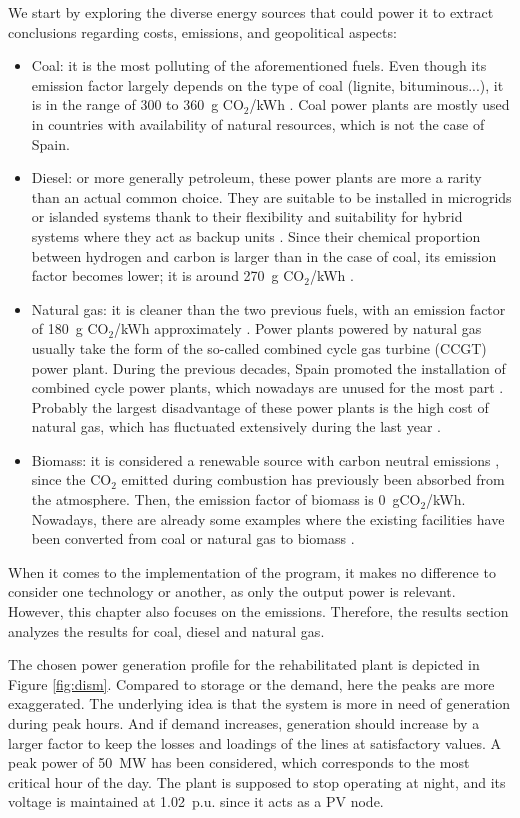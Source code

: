 We start by exploring the diverse energy sources that could power it to extract conclusions regarding costs, emissions, and geopolitical aspects:
\begin{itemize}
  \item Coal: it is the most polluting of the aforementioned fuels. Even though its emission factor largely depends on the type of coal (lignite, bituminous...), it is in the range of 300 to 360~g CO$_2$/kWh \cite{gencat}. Coal power plants are mostly used in countries with availability of natural resources, which is not the case of Spain.
  \item Diesel: or more generally petroleum, these power plants are more a rarity than an actual common choice. They are suitable to be installed in microgrids or islanded systems thank to their flexibility and suitability for hybrid systems where they act as backup units \cite{ismail2013techno}. Since their chemical proportion between hydrogen and carbon is larger than in the case of coal, its emission factor becomes lower; it is around 270~g CO$_2$/kWh \cite{gencat}. 
  \item Natural gas: it is cleaner than the two previous fuels, with an emission factor of 180~g CO$_2$/kWh approximately \cite{gencat}. Power plants powered by natural gas usually take the form of the so-called combined cycle gas turbine (CCGT) power plant. During the previous decades, Spain promoted the installation of combined cycle power plants, which nowadays are unused for the most part \cite{aleasoft}. Probably the largest disadvantage of these power plants is the high cost of natural gas, which has fluctuated extensively during the last year \cite{gascost}. 
  \item Biomass: it is considered a renewable source with carbon neutral emissions \cite{gencat}, since the CO$_2$ emitted during combustion has previously been absorbed from the atmosphere. Then, the emission factor of biomass is 0~gCO$_2$/kWh. Nowadays, there are already some examples where the existing facilities have been converted from coal or natural gas to biomass \cite{grontmij}.
\end{itemize}
When it comes to the implementation of the program, it makes no difference to consider one technology or another, as only the output power is relevant. However, this chapter also focuses on the emissions. Therefore, the results section analyzes the results for coal, diesel and natural gas.

The chosen power generation profile for the rehabilitated plant is depicted in Figure \ref{fig:dism}. Compared to storage or the demand, here the peaks are more exaggerated. The underlying idea is that the system is more in need of generation during peak hours. And if demand increases, generation should increase by a larger factor to keep the losses and loadings of the lines at satisfactory values. A peak power of 50~MW has been considered, which corresponds to the most critical hour of the day. The plant is supposed to stop operating at night, and its voltage is maintained at 1.02~p.u. since it acts as a PV node.



